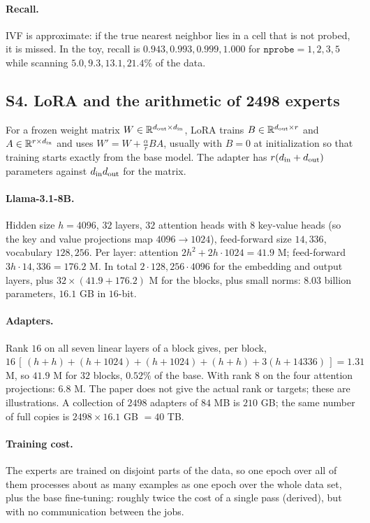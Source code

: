 \documentclass[11pt]{article}
\newcommand{\R}{\mathbb{R}}
\begin{document}
\paragraph{Recall.} IVF is approximate: if the true nearest neighbor lies in a cell that is not probed, it is missed. In the toy, recall is $0.943,0.993,0.999,1.000$ for $\texttt{nprobe}=1,2,3,5$ while scanning $5.0,9.3,13.1,21.4\%$ of the data.

\label{sec:S4}
\subsection*{S4. LoRA and the arithmetic of 2498 experts}
For a frozen weight matrix $W\in\R^{d_{\rm out}\times d_{\rm in}}$, LoRA trains $B\in\R^{d_{\rm out}\times r}$ and $A\in\R^{r\times d_{\rm in}}$ and uses $W'=W+\frac\alpha rBA$, usually with $B=0$ at initialization so that training starts exactly from the base model. The adapter has $r(d_{\rm in}+d_{\rm out})$ parameters against $d_{\rm in}d_{\rm out}$ for the matrix.

\paragraph{Llama-3.1-8B.} Hidden size $h=4096$, $32$ layers, $32$ attention heads with $8$ key-value heads (so the key and value projections map $4096\to1024$), feed-forward size $14{,}336$, vocabulary $128{,}256$. Per layer: attention $2h^2+2h\cdot1024=41.9$ M; feed-forward $3h\cdot14{,}336=176.2$ M. In total $2\cdot128{,}256\cdot4096$ for the embedding and output layers, plus $32\times(41.9+176.2)$ M for the blocks, plus small norms: $8.03$ billion parameters, $16.1$ GB in $16$-bit.

\paragraph{Adapters.} Rank $16$ on all seven linear layers of a block gives, per block, $16\,[\,(h+h)+(h+1024)+(h+1024)+(h+h)+3(h+14336)\,]=1.31$ M, so $41.9$ M for $32$ blocks, $0.52\%$ of the base. With rank $8$ on the four attention projections: $6.8$ M. The paper does not give the actual rank or targets; these are illustrations. A collection of $2498$ adapters of $84$ MB is $210$ GB; the same number of full copies is $2498\times16.1$ GB $=40$ TB.

\paragraph{Training cost.} The experts are trained on disjoint parts of the data, so one epoch over all of them processes about as many examples as one epoch over the whole data set, plus the base fine-tuning: roughly twice the cost of a single pass (derived), but with no communication between the jobs.
\end{document}
